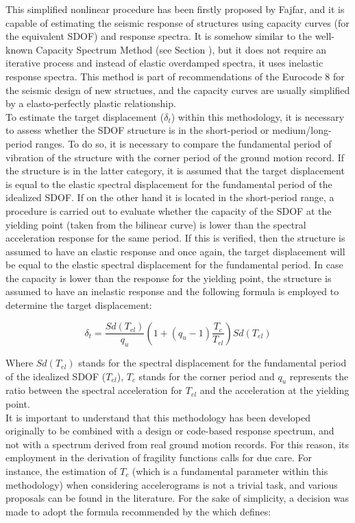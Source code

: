 This simplified nonlinear procedure has been firstly proposed by Fajfar, and it is capable of estimating the seismic response of structures using capacity curves (for the equivalent SDOF) and response spectra. It is somehow similar to the well-known Capacity Spectrum Method (see Section ), but it does not require an iterative process and instead of elastic overdamped spectra, it uses inelastic response spectra. This method is part of recommendations of the Eurocode 8 \citep{CEN2005} for the seismic design of new structues, and the capacity curves are usually simplified by a elasto-perfectly plastic relationship.\\

To estimate the target displacement ($\delta_t$) within this methodology, it is necessary to assess whether the SDOF structure is in the short-period or medium/long-period ranges. To do so, it is necessary to compare the fundamental period of vibration of the structure with the corner period of the ground motion record. If the structure is in the latter category, it is assumed that the target displacement is equal to the elastic spectral displacement for the fundamental period of the idealized SDOF. If on the other hand it is located in the short-period range, a procedure is carried out to evaluate whether the capacity of the SDOF at the yielding point (taken from the bilinear curve) is lower than the spectral acceleration response for the same period. If this is verified, then the structure is assumed to have an elastic response and once again, the target displacement will be equal to the elastic spectral displacement for the fundamental period. In case the capacity is lower than the response for the yielding point, the structure is assumed to have an inelastic response and the following formula is employed to determine the target displacement:

\begin{equation}
\delta_t = \frac{Sd(T_{el})}{q_u}\left(1+(q_u-1)\frac{T_c}{T_{el}}\right)Sd(T_{el})
\end{equation}

Where $Sd(T_{el})$ stands for the spectral displacement for the fundamental period of the idealized SDOF ($T_{el}$), $T_c$ stands for the corner period and $q_u$ represents the ratio between the spectral acceleration for $T_{el}$ and the acceleration at the yielding point.\\

It is important to understand that this methodology has been developed originally to be combined with a design or code-based response spectrum, and not with a spectrum derived from real ground motion records. For this reason, its employment in the derivation of fragility functions calls for due care. For instance, the estimation of $T_c$ (which is a fundamental parameter within this methodology) when considering accelerograms is not a trivial task, and various proposals can be found in the literature. For the sake of simplicity, a decision was made to adopt the formula recommended by the \cite{ASCE2010} which defines:

